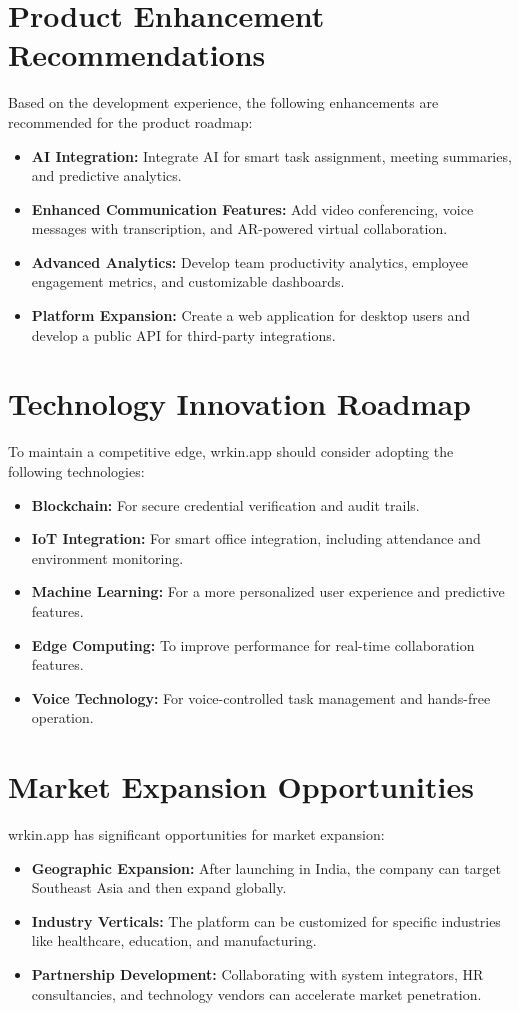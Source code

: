 \section{Product Enhancement Recommendations}
Based on the development experience, the following enhancements are recommended for the product roadmap:
\begin{itemize}
    \item \textbf{AI Integration:} Integrate AI for smart task assignment, meeting summaries, and predictive analytics.
    \item \textbf{Enhanced Communication Features:} Add video conferencing, voice messages with transcription, and AR-powered virtual collaboration.
    \item \textbf{Advanced Analytics:} Develop team productivity analytics, employee engagement metrics, and customizable dashboards.
    \item \textbf{Platform Expansion:} Create a web application for desktop users and develop a public API for third-party integrations.
\end{itemize}

\section{Technology Innovation Roadmap}
To maintain a competitive edge, wrkin.app should consider adopting the following technologies:
\begin{itemize}
    \item \textbf{Blockchain:} For secure credential verification and audit trails.
    \item \textbf{IoT Integration:} For smart office integration, including attendance and environment monitoring.
    \item \textbf{Machine Learning:} For a more personalized user experience and predictive features.
    \item \textbf{Edge Computing:} To improve performance for real-time collaboration features.
    \item \textbf{Voice Technology:} For voice-controlled task management and hands-free operation.
\end{itemize}

\section{Market Expansion Opportunities}
wrkin.app has significant opportunities for market expansion:
\begin{itemize}
    \item \textbf{Geographic Expansion:} After launching in India, the company can target Southeast Asia and then expand globally.
    \item \textbf{Industry Verticals:} The platform can be customized for specific industries like healthcare, education, and manufacturing.
    \item \textbf{Partnership Development:} Collaborating with system integrators, HR consultancies, and technology vendors can accelerate market penetration.
\end{itemize}

